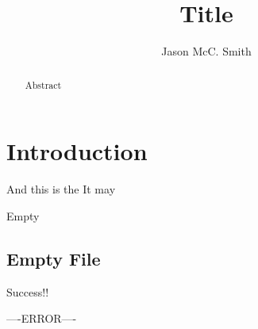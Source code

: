 \documentclass{article}
\title{Title}
\author{Jason McC. Smith}
\begin{document}
\maketitle

\begin{abstract}
    Abstract
\end{abstract}

\section{Introduction}
And this is the 
It may 

\iffileemptyelse
{Empty}
{
\subsection{Empty File}
Success!!
}
{----ERROR----}


\end{document}
